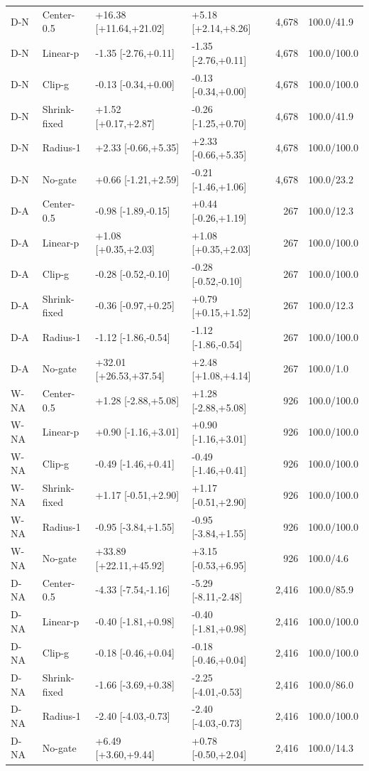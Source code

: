 \begin{table}[htbp]
\begin{tabular}{llllrl}
D-N & Center-0.5 & +16.38 [+11.64,+21.02] & +5.18 [+2.14,+8.26] & 4,678 & 100.0/41.9\\
D-N & Linear-p & -1.35 [-2.76,+0.11] & -1.35 [-2.76,+0.11] & 4,678 & 100.0/100.0\\
D-N & Clip-g & -0.13 [-0.34,+0.00] & -0.13 [-0.34,+0.00] & 4,678 & 100.0/100.0\\
D-N & Shrink-fixed & +1.52 [+0.17,+2.87] & -0.26 [-1.25,+0.70] & 4,678 & 100.0/41.9\\
D-N & Radius-1 & +2.33 [-0.66,+5.35] & +2.33 [-0.66,+5.35] & 4,678 & 100.0/100.0\\
D-N & No-gate & +0.66 [-1.21,+2.59] & -0.21 [-1.46,+1.06] & 4,678 & 100.0/23.2\\
D-A & Center-0.5 & -0.98 [-1.89,-0.15] & +0.44 [-0.26,+1.19] & 267 & 100.0/12.3\\
D-A & Linear-p & +1.08 [+0.35,+2.03] & +1.08 [+0.35,+2.03] & 267 & 100.0/100.0\\
D-A & Clip-g & -0.28 [-0.52,-0.10] & -0.28 [-0.52,-0.10] & 267 & 100.0/100.0\\
D-A & Shrink-fixed & -0.36 [-0.97,+0.25] & +0.79 [+0.15,+1.52] & 267 & 100.0/12.3\\
D-A & Radius-1 & -1.12 [-1.86,-0.54] & -1.12 [-1.86,-0.54] & 267 & 100.0/100.0\\
D-A & No-gate & +32.01 [+26.53,+37.54] & +2.48 [+1.08,+4.14] & 267 & 100.0/1.0\\
W-NA & Center-0.5 & +1.28 [-2.88,+5.08] & +1.28 [-2.88,+5.08] & 926 & 100.0/100.0\\
W-NA & Linear-p & +0.90 [-1.16,+3.01] & +0.90 [-1.16,+3.01] & 926 & 100.0/100.0\\
W-NA & Clip-g & -0.49 [-1.46,+0.41] & -0.49 [-1.46,+0.41] & 926 & 100.0/100.0\\
W-NA & Shrink-fixed & +1.17 [-0.51,+2.90] & +1.17 [-0.51,+2.90] & 926 & 100.0/100.0\\
W-NA & Radius-1 & -0.95 [-3.84,+1.55] & -0.95 [-3.84,+1.55] & 926 & 100.0/100.0\\
W-NA & No-gate & +33.89 [+22.11,+45.92] & +3.15 [-0.53,+6.95] & 926 & 100.0/4.6\\
D-NA & Center-0.5 & -4.33 [-7.54,-1.16] & -5.29 [-8.11,-2.48] & 2,416 & 100.0/85.9\\
D-NA & Linear-p & -0.40 [-1.81,+0.98] & -0.40 [-1.81,+0.98] & 2,416 & 100.0/100.0\\
D-NA & Clip-g & -0.18 [-0.46,+0.04] & -0.18 [-0.46,+0.04] & 2,416 & 100.0/100.0\\
D-NA & Shrink-fixed & -1.66 [-3.69,+0.38] & -2.25 [-4.01,-0.53] & 2,416 & 100.0/86.0\\
D-NA & Radius-1 & -2.40 [-4.03,-0.73] & -2.40 [-4.03,-0.73] & 2,416 & 100.0/100.0\\
D-NA & No-gate & +6.49 [+3.60,+9.44] & +0.78 [-0.50,+2.04] & 2,416 & 100.0/14.3\\
\bottomrule
\end{tabular}
\end{table}
